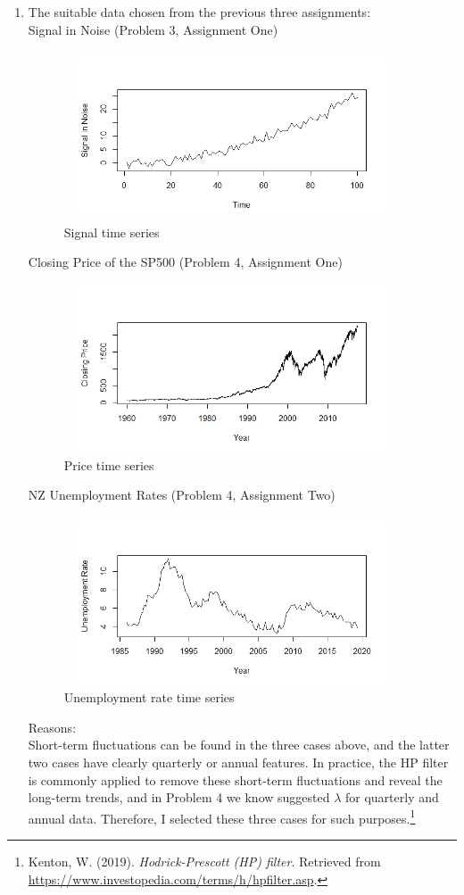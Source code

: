 \documentclass[10pt]{article}
\begin{document}
\begin{enumerate}[1)]
\item
The suitable data chosen from the previous three assignments:\\
Signal in Noise (Problem 3, Assignment One)
\begin{figure}[H]
  \centering
  \includegraphics[width=10cm,height=5cm]{p16a.jpeg}
  \caption{Signal time series} %
\end{figure}
Closing Price of the SP500 (Problem 4, Assignment One)
\begin{figure}[H]
  \centering
  \includegraphics[width=10cm,height=5cm]{p16b.jpeg}
  \caption{Price time series}
\end{figure}
NZ Unemployment Rates (Problem 4, Assignment Two)
\begin{figure}[H]
  \centering
  \includegraphics[width=10cm,height=5cm]{p16c.jpeg}
  \caption{Unemployment rate time series}
\end{figure}
Reasons:\\ %
Short-term fluctuations can be found in the three cases above, and the latter two cases have clearly quarterly or annual features. In practice, the HP filter is commonly applied to remove these short-term fluctuations and reveal the long-term trends, and in Problem 4 we know suggested $\lambda$ for quarterly and annual data. Therefore, I selected these three cases for such purposes.\footnote{ Kenton, W. (2019). \textit{Hodrick-Prescott (HP) filter}. Retrieved from \url{https://www.investopedia.com/terms/h/hpfilter.asp}.}
\vspace{3mm}


\end{enumerate}
\end{document}
